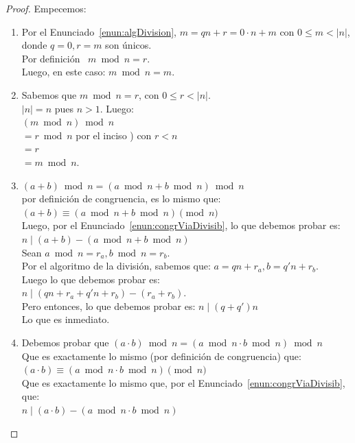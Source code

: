 \begin{proof} Empecemos:
\begin{enumerate}[label=\roman*)]
\item Por el Enunciado~\ref{enun:algDivision}, $m = qn + r = 0 \cdot n + m$ con $0 \leq m < |n|$, \\ donde $q = 0, r = m$ son únicos. \\
Por definición \, $m \bmod n = r$. \\
Luego, en este caso: $m \bmod n = m$. 
\item Sabemos que $m \bmod n = r$, con $0 \leq r < |n|$. \\ $|n| = n$ pues $n > 1$. Luego: \\
$(m \bmod n) \bmod n$ \\
\setcounter{enumi}{1}
$= r \bmod n$ \qquad por el inciso ) con $r < n$\\
$= r$ \\
$= m \bmod n$. 
\setcounter{enumi}{2}
\item $(a + b) \bmod n = (a \bmod n + b \bmod n) \bmod n$  \\ 
por definición de congruencia, es lo mismo que:  \\ 
$(a+b) \equiv (a \bmod n + b \bmod n) \pmod n$ \\
Luego, por el Enunciado~\ref{enun:congrViaDivisib}, lo que debemos probar es:  \\ 
$n \mid (a+b)-(a \bmod n + b \bmod n)$ \\ 
Sean $a \bmod n = r_a, b \bmod n = r_b$.  \\ 
Por el algoritmo de la división, sabemos que: $a = qn + r_a, b = q'n + r_b$.  \\ 
Luego lo que debemos probar es:  \\ 
$n \mid (qn+r_a + q'n + r_b) - (r_a + r_b)$. \\ 
Pero entonces, lo que debemos probar es: $n \mid (q+q')n$  \\ 
Lo que es inmediato. 
\item Debemos probar que $(a \cdot b) \bmod n = (a \bmod n \cdot b \bmod n) \bmod n$  \\ 
Que es exactamente lo mismo (por definición de congruencia) que:  \\ 
$(a \cdot b) \equiv (a \bmod n \cdot b \bmod n) \pmod n$ \\
Que es exactamente lo mismo que, por el Enunciado~\ref{enun:congrViaDivisib}, que:  \\ 
$n \mid (a \cdot b) - (a \bmod n \cdot b \bmod n)$  \\ 

\end{enumerate}
\end{proof}
